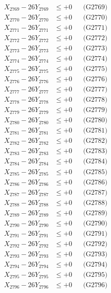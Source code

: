 \documentclass[a4paper,10pt]{article}
\begin{document}
{\begin{align}
X_{2769} - 26Y_{2769} &\leq +0 && \text{(G2769)} \\
X_{2770} - 26Y_{2770} &\leq +0 && \text{(G2770)} \\
\allowbreak
X_{2771} - 26Y_{2771} &\leq +0 && \text{(G2771)} \\
X_{2772} - 26Y_{2772} &\leq +0 && \text{(G2772)} \\
X_{2773} - 26Y_{2773} &\leq +0 && \text{(G2773)} \\
X_{2774} - 26Y_{2774} &\leq +0 && \text{(G2774)} \\
X_{2775} - 26Y_{2775} &\leq +0 && \text{(G2775)} \\
X_{2776} - 26Y_{2776} &\leq +0 && \text{(G2776)} \\
X_{2777} - 26Y_{2777} &\leq +0 && \text{(G2777)} \\
X_{2778} - 26Y_{2778} &\leq +0 && \text{(G2778)} \\
X_{2779} - 26Y_{2779} &\leq +0 && \text{(G2779)} \\
X_{2780} - 26Y_{2780} &\leq +0 && \text{(G2780)} \\
\allowbreak
X_{2781} - 26Y_{2781} &\leq +0 && \text{(G2781)} \\
X_{2782} - 26Y_{2782} &\leq +0 && \text{(G2782)} \\
X_{2783} - 26Y_{2783} &\leq +0 && \text{(G2783)} \\
X_{2784} - 26Y_{2784} &\leq +0 && \text{(G2784)} \\
X_{2785} - 26Y_{2785} &\leq +0 && \text{(G2785)} \\
X_{2786} - 26Y_{2786} &\leq +0 && \text{(G2786)} \\
X_{2787} - 26Y_{2787} &\leq +0 && \text{(G2787)} \\
X_{2788} - 26Y_{2788} &\leq +0 && \text{(G2788)} \\
X_{2789} - 26Y_{2789} &\leq +0 && \text{(G2789)} \\
X_{2790} - 26Y_{2790} &\leq +0 && \text{(G2790)} \\
\allowbreak
X_{2791} - 26Y_{2791} &\leq +0 && \text{(G2791)} \\
X_{2792} - 26Y_{2792} &\leq +0 && \text{(G2792)} \\
X_{2793} - 26Y_{2793} &\leq +0 && \text{(G2793)} \\
X_{2794} - 26Y_{2794} &\leq +0 && \text{(G2794)} \\
X_{2795} - 26Y_{2795} &\leq +0 && \text{(G2795)} \\
X_{2796} - 26Y_{2796} &\leq +0 && \text{(G2796)} \\

\end{align}}
\end{document}
